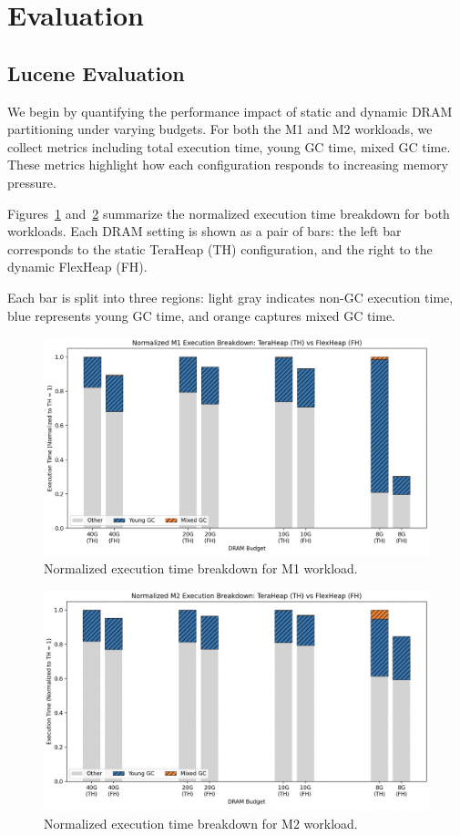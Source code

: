 \section{Evaluation}

\subsection{Lucene Evaluation}

We begin by quantifying the performance impact of static and dynamic DRAM partitioning under varying budgets. 
For both the M1 and M2 workloads, we collect metrics including total execution time, 
young GC time, mixed GC time. These metrics highlight how each configuration 
responds to increasing memory pressure.

Figures~\ref{fig:m1-exec} and~\ref{fig:m2-exec} summarize the normalized execution time breakdown for both workloads.
Each DRAM setting is shown as a pair of bars: the left bar corresponds to the static TeraHeap (TH) configuration, 
and the right to the dynamic FlexHeap (FH).

Each bar is split into three regions: 
light gray indicates non-GC execution time, 
blue represents young GC time, 
and orange captures mixed GC time.

\begin{figure}[htbp]
  \centering
  \includegraphics[width=0.95\linewidth]{fig/M1_exec.png}
  \caption{Normalized execution time breakdown for M1 workload.}
  \label{fig:m1-exec}
\end{figure}

\begin{figure}[htbp]
  \centering
  \includegraphics[width=0.95\linewidth]{fig/M2_exec.png}
  \caption{Normalized execution time breakdown for M2 workload.}
  \label{fig:m2-exec}
\end{figure}

